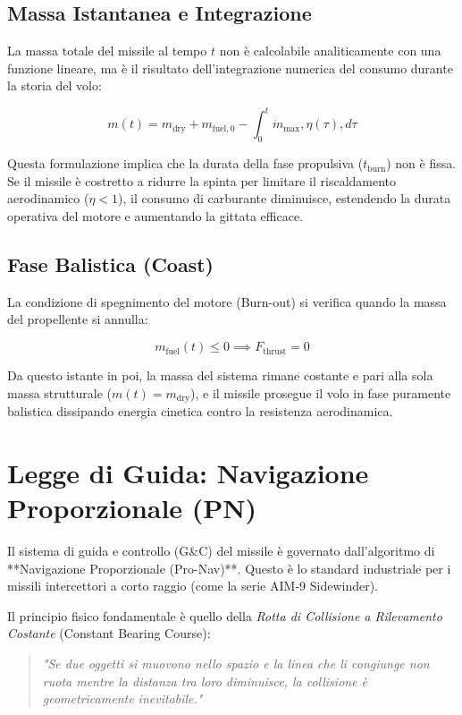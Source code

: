\documentclass[12pt,a4paper]{article}
\begin{document}
\subsection{Massa Istantanea e Integrazione}
La massa totale del missile al tempo $t$ non è calcolabile analiticamente con una funzione lineare, ma è il risultato dell'integrazione numerica del consumo durante la storia del volo:

\begin{equation} m(t) = m_{\text{dry}} + m_{\text{fuel},0} - \int_{0}^{t} \dot{m}_{\text{max}} , \eta(\tau) , d\tau \end{equation}

Questa formulazione implica che la durata della fase propulsiva ($t_{\text{burn}}$) non è fissa. Se il missile è costretto a ridurre la spinta per limitare il riscaldamento aerodinamico ($\eta < 1$), il consumo di carburante diminuisce, estendendo la durata operativa del motore e aumentando la gittata efficace.

\subsection{Fase Balistica (Coast)}
La condizione di spegnimento del motore (Burn-out) si verifica quando la massa del propellente si annulla:

\begin{equation}
    m_{\text{fuel}}(t) \le 0 \implies F_{\text{thrust}} = 0
\end{equation}

Da questo istante in poi, la massa del sistema rimane costante e pari alla sola massa strutturale ($m(t) = m_{\text{dry}}$), e il missile prosegue il volo in fase puramente balistica dissipando energia cinetica contro la resistenza aerodinamica.

\section{Legge di Guida: Navigazione Proporzionale (PN)}

Il sistema di guida e controllo (G\&C) del missile è governato dall'algoritmo di **Navigazione Proporzionale (Pro-Nav)**. Questo è lo standard industriale per i missili intercettori a corto raggio (come la serie AIM-9 Sidewinder).

Il principio fisico fondamentale è quello della \textit{Rotta di Collisione a Rilevamento Costante} (Constant Bearing Course):
\begin{quote}
    \textit{"Se due oggetti si muovono nello spazio e la linea che li congiunge non ruota mentre la distanza tra loro diminuisce, la collisione è geometricamente inevitabile."}
\end{quote}
\end{document}
